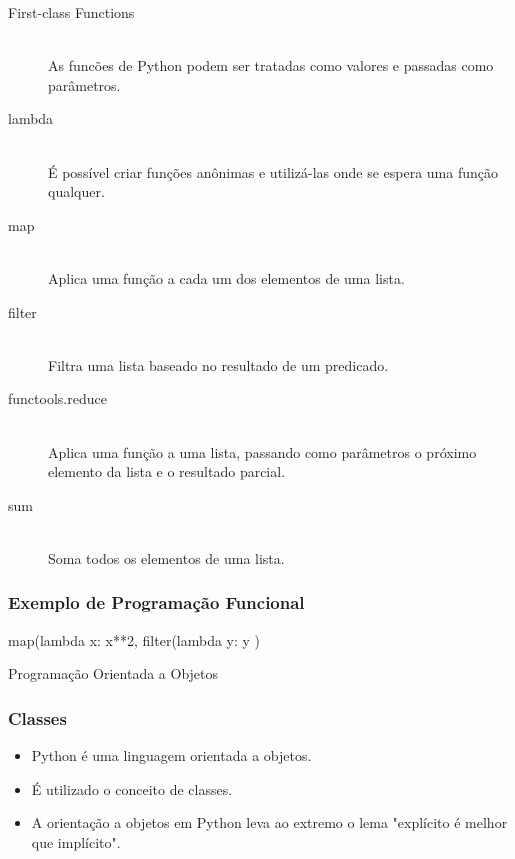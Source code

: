 \documentclass[aspectratio=169,14pt]{beamer}
\begin{document}
\begin{frame}
    \footnotesize
    \begin{description}
        \item[First-class Functions] \hfill \\ As funcões de Python podem ser
        tratadas como valores e passadas como parâmetros.
        \item[lambda] \hfill \\  É possível criar funções anônimas e utilizá-las
        onde se espera uma função qualquer.
        \item[map]  \hfill \\ Aplica uma função a cada um dos elementos de uma lista.
        \item[filter]  \hfill \\ Filtra uma lista baseado no resultado de um predicado.
        \item[functools.reduce]  \hfill \\ Aplica uma função a uma lista, passando como
        parâmetros o próximo elemento da lista e o resultado parcial.
        \item[sum]  \hfill \\ Soma todos os elementos de uma lista.
    \end{description}
\end{frame}

\begin{frame}[fragile]
    \frametitle{Exemplo de Programação Funcional}
    \begin{python}
        map(lambda x: x**2,
            filter(lambda y: y %
        )
    \end{python}
\end{frame}


\begin{frame}
    \begin{center}
        \Huge Programação Orientada a Objetos
    \end{center}
\end{frame}
\begin{frame}
    \frametitle{Classes}
    \begin{itemize}[label={}]
        \setlength\itemsep{1.5em}
        \item Python é uma linguagem orientada a objetos.
        \item É utilizado o conceito de classes.
        \item A orientação a objetos em Python leva ao extremo o
        lema "explícito é melhor que implícito".
    \end{itemize}
\end{frame}
\end{document}
